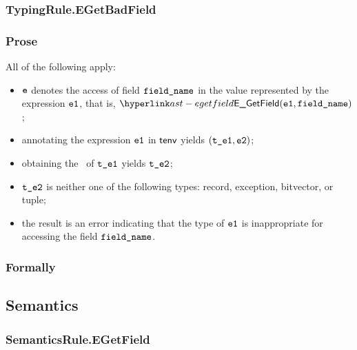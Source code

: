 \subsubsection{TypingRule.EGetBadField \label{sec:TypingRule.EGetBadField}}
\subsubsection{Prose}
All of the following apply:
\begin{itemize}
  \item $\ve$ denotes the access of field $\fieldname$ in the value represented by the expression $\veone$, that is, $\EGetField(\veone, \fieldname)$;
  \item annotating the expression $\veone$ in $\tenv$ yields $(\vteone, \vetwo)$\ProseOrTypeError;
  \item obtaining the \underlyingtype\ of $\vteone$ yields $\vtetwo$\ProseOrTypeError;
  \item $\vtetwo$ is neither one of the following types: record, exception, bitvector, or tuple;
  \item the result is an error indicating that the type of $\veone$ is inappropriate for accessing the field $\fieldname$.
\end{itemize}
\subsubsection{Formally}
\begin{mathpar}
\end{mathpar}

\subsection{Semantics}
\subsubsection{SemanticsRule.EGetField \label{sec:SemanticsRule.EGetField}}

